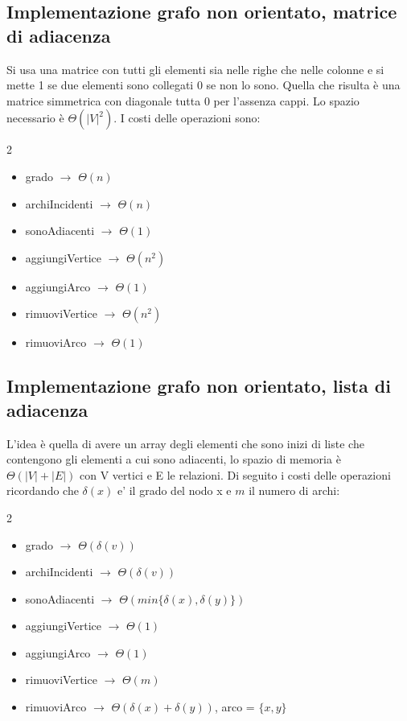 \documentclass{article}
\begin{document}
\subsection{Implementazione grafo non orientato, matrice di adiacenza}
Si usa una matrice con tutti gli elementi sia nelle righe che nelle colonne e si mette 1 se due elementi sono collegati 0 se non lo sono. Quella che risulta è una matrice simmetrica con diagonale tutta 0 per l'assenza cappi.
Lo spazio necessario è $\Theta(|V|^2)$. I costi delle operazioni sono:
\begin{multicols}{2}
\begin{itemize}
    \item grado $\rightarrow$  $\Theta(n)$
    \item archiIncidenti $\rightarrow$ $\Theta(n)$
    \item sonoAdiacenti  $\rightarrow$ $\Theta(1)$
    \item aggiungiVertice $\rightarrow$ $\Theta(n^2)$
    \item aggiungiArco $\rightarrow$ $\Theta(1)$
    \item rimuoviVertice $\rightarrow$ $\Theta(n^2)$
    \item rimuoviArco $\rightarrow$ $\Theta(1)$
\end{itemize}
\end{multicols}

\subsection{Implementazione grafo non orientato, lista di adiacenza}
L'idea è quella di avere un array degli elementi che sono inizi di liste che contengono gli elementi a cui sono adiacenti, lo spazio di memoria è $\Theta(|V|+|E|)$ con V vertici e E le relazioni.
Di seguito i costi delle operazioni ricordando che $\delta(x)$ e' il grado del nodo x e $m$ il numero di archi:
\begin{multicols}{2}
\begin{itemize}
    \item grado $\rightarrow$  $\Theta(\delta(v))$
    \item archiIncidenti $\rightarrow$ $\Theta(\delta(v))$
    \item sonoAdiacenti $\rightarrow$ $\Theta(min\{\delta(x),\delta(y)\})$
    \item aggiungiVertice $\rightarrow$ $\Theta(1)$
    \item aggiungiArco $\rightarrow$ $\Theta(1)$
    \item rimuoviVertice $\rightarrow$ $\Theta(m)$
    \item rimuoviArco $\rightarrow$ $\Theta(\delta(x)+\delta(y))$, arco = $\{x,y\}$
\end{itemize}
\end{multicols}
\end{document}
